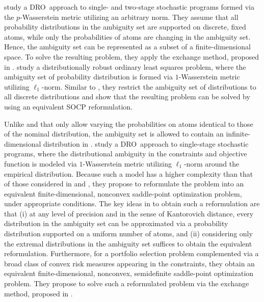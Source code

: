 \documentclass[final,onefignum,onetabnum]{class}
\newcommand{\Bs}[1]{\mathbb{#1}} %
\newcommand{\dro}{DRO}
\begin{document}
 \citet{pflug2014}  study a \dro\ approach to single- and two-stage stochastic  programs formed via the $p$-Wasserstein metric utilizing an arbitrary norm. They assume that all probability distributions in the ambiguity set are  supported on discrete, fixed atoms, while only the  probabilities of atoms are changing in the ambiguity set.
Hence, the ambiguity set can be represented as a subset of a finite-dimensional space. To solve the resulting problem, they apply the exchange method, proposed in \citet{pflug2007}. %
\citet{mehrotra2014} study a distributionally robust ordinary least squares problem, where the ambiguity set of probability distribution is formed via $1$-Wasserstein metric utilizing $\ell_{1}$-norm. Similar to \citet{pflug2014}, they restrict the ambiguity set of distributions to all discrete distributions and show that the resulting problem can be solved by using an equivalent SOCP reformulation. 

Unlike \citet{pflug2014}  and \citet{mehrotra2014} that only allow varying the  probabilities on atoms identical to those of the nominal distribution, the ambiguity set is allowed to contain  an infinite-dimensional distribution in \citet{wozabal2012}.  \citet{wozabal2012} study a \dro\ approach to single-stage stochastic programs, where the distributional ambiguity in the constraints and objective  function  is modeled via  $1$-Wasserstein metric utilizing $\ell_{1}$-norm around the empirical distribution. Because such a model has a higher complexity than that of those considered in \citet{pflug2014}  and \citet{mehrotra2014}, they propose to reformulate the problem into an equivalent   finite-dimensional, nonconvex saddle-point optimization problem, under appropriate conditions. The key ideas in \citet{wozabal2012} to obtain such a reformulation are that (i) at any level of precision and in the sense of Kantorovich distance, every distribution in the ambiguity set can be  approximated  via a probability distribution supported on a uniform number of atoms, and (ii) considering only the  extremal distributions in the ambiguity set suffices to obtain the equivalent  reformulation. Furthermore, for a portfolio selection problem complemented via a broad class of convex risk measures appearing in the constraints, they obtain an equivalent finite-dimensional, nonconvex,  semidefinite  saddle-point optimization problem. They propose to solve such a reformulated problem via the exchange method, proposed in \citet{pflug2007}. %
\end{document}
